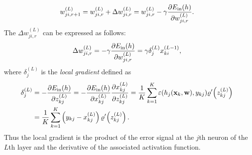 \begin{equation}
w_{ji,r+1}^{(L)}=w_{ji,r}^{(L)}+\Delta w_{ji,r}^{(L)}=w_{ji,r}^{(L)}-\gamma\frac{\partial E_{\mathrm{in}}(h)}{\partial w_{ji,r}^{(L)}}.
\end{equation}
The $\Delta w_{ji,r}^{(L)}$ can be expressed as follows:
\begin{equation}
\Delta w_{ji,r}^{(L)}=-\gamma\frac{\partial E_{\mathrm{in}}(h)}{\partial w_{ji,r}^{(L)}}=\gamma\delta_{j}^{(L)}x_{ki}^{(L-1)},
\end{equation}
where $\delta_{j}^{(L)}$ is the \textit{local gradient} defined as
\begin{align}
\delta_{j}^{(L)}&=-\frac{\partial E_{\mathrm{in}}(h)}{\partial z_{kj}^{(L)}}=-\frac{\partial E_{\mathrm{in}}(h)}{\partial x_{kj}^{(L)}}\frac{\partial x_{kj}^{(L)}}{\partial z_{kj}^{(L)}}=\frac{1}{K}\sum_{k=1}^{K}\varepsilon(h_j(\mathbf{x}_k,\mathbf{w}),y_{kj})\varrho'\!\left(z_{kj}^{(L)}\right)\nonumber\\
&=\frac{1}{K}\sum_{k=1}^{K}\left(y_{kj}-x_{kj}^{(L)}\right)\varrho'\!\left(z_{kj}^{(L)}\right).
\end{align}
Thus the local gradient is the product of the error signal at the $j$th neuron of the $L$th layer and the derivative of the associated activation function.

